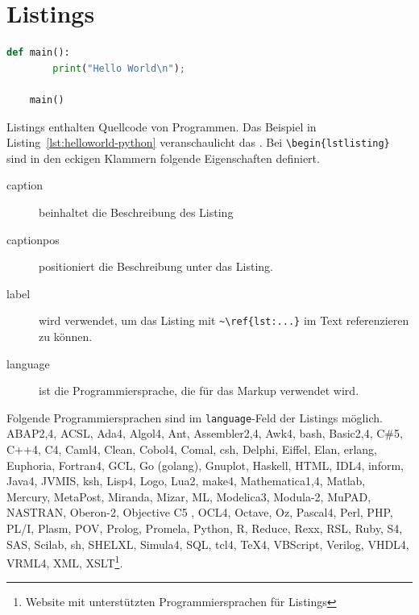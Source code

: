 \section{Listings}
\begin{lstlisting}[caption={HelloWorld Programm in Python},captionpos={b},label={lst:helloworld-python},language={Python}] 
    def main():
        print("Hello World\n");
        
    main()
\end{lstlisting}

Listings enthalten Quellcode von Programmen.
Das Beispiel in Listing~\ref{lst:helloworld-python} veranschaulicht das .
Bei \lstinline|\begin{lstlisting}| sind in den eckigen Klammern folgende Eigenschaften definiert.
\begin{description}
    \item[caption] beinhaltet die Beschreibung des Listing
    \item[captionpos] positioniert die Beschreibung unter das Listing.
    \item[label] wird verwendet, um das Listing mit \lstinline|~\ref{lst:...}| im Text referenzieren zu können.
    \item[language] ist die Programmiersprache, die für das Markup verwendet wird.
\end{description}
Folgende Programmiersprachen sind im \lstinline|language|-Feld der Listings möglich.\\
ABAP2,4, ACSL, Ada4, Algol4, Ant, Assembler2,4, Awk4, bash, Basic2,4, C\#5, C++4, C4, Caml4, Clean, 
Cobol4, Comal, csh, Delphi, Eiffel, Elan, erlang, Euphoria, Fortran4, GCL, Go (golang), Gnuplot, Haskell, 
HTML, IDL4, inform, Java4, JVMIS, ksh, Lisp4, Logo, Lua2, make4, Mathematica1,4, Matlab, Mercury, MetaPost, 
Miranda, Mizar, ML, Modelica3, Modula-2, MuPAD, NASTRAN, Oberon-2, Objective C5 , OCL4, Octave, Oz, Pascal4, 
Perl, PHP, PL/I, Plasm, POV, Prolog, Promela, Python, R, Reduce, Rexx, RSL, Ruby, S4, SAS, Scilab, sh, SHELXL, 
Simula4, SQL, tcl4, TeX4, VBScript, Verilog, VHDL4, VRML4, XML, XSLT\footnote{Website mit unterstützten Programmiersprachen für Listings}. 
